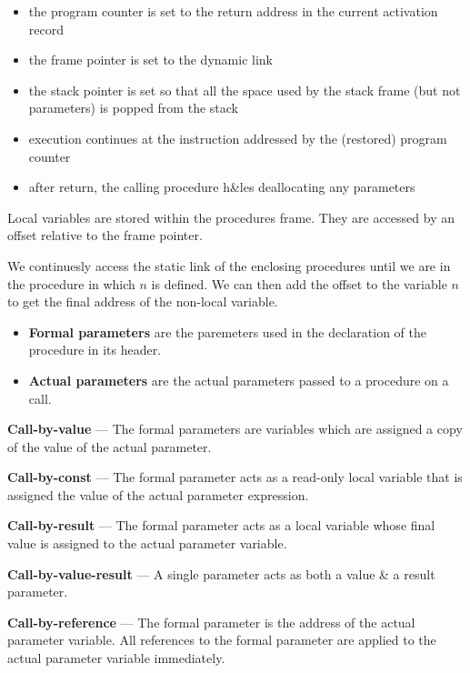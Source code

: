\begin{itemize}
    \item the program counter is set to the return address in the current activation record
    \item the frame pointer is set to the dynamic link
    \item the stack pointer is set so that all the space used by the stack frame (but not 
    parameters) is popped from the stack
    \item execution continues at the instruction addressed by the (restored) program counter
    \item after return, the calling procedure h\&les deallocating any parameters
\end{itemize}

Local variables are stored within the procedures frame. They are accessed by an offset 
relative to the frame pointer.

We continuesly access the static link of the enclosing procedures until we are in the procedure 
in which $n$ is defined. We can then add the offset to the variable $n$ to get the final address 
of the non-local variable.

\begin{itemize}
    \item \textbf{Formal parameters} are the paremeters used in the declaration of the procedure 
    in its header.
    \item \textbf{Actual parameters} are the actual parameters passed to a procedure on a call.
\end{itemize}
\textbf{Call-by-value} ---
The formal parameters are variables which are assigned a copy of the value of the actual parameter.

\textbf{Call-by-const} ---
The formal parameter acts as a read-only local variable that is assigned the value of the actual 
parameter expression.

\textbf{Call-by-result} ---
The formal parameter acts as a local variable whose final value is assigned to the actual parameter 
variable.

\textbf{Call-by-value-result} ---
A single parameter acts as both a value \& a result parameter.

\textbf{Call-by-reference} ---
The formal parameter is the address of the actual parameter variable. All references to the formal 
parameter are applied to the actual parameter variable immediately.

